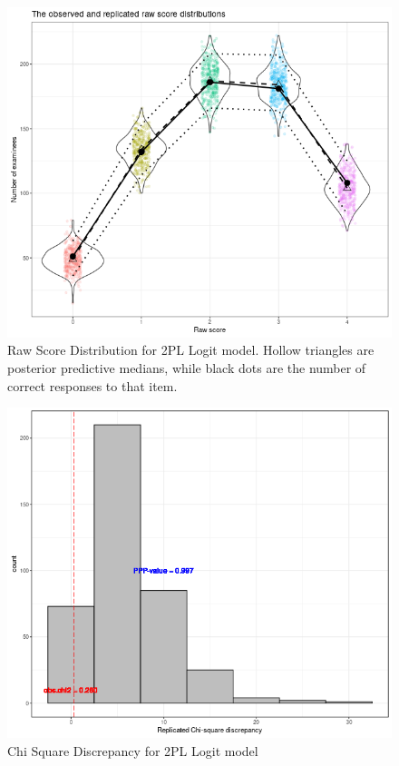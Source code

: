 \documentclass[12pt]{article}
\begin{document}
\begin{figure}[h]
\vspace{-0.5cm}
  \centering
  \includegraphics[width=1\columnwidth]{Plots/Plots_2PL_Logit/raw_score_dist.png}
  \caption{Raw Score Distribution for 2PL Logit model. Hollow triangles are posterior predictive medians, while black dots are the number of correct responses to that item.}
  \label{2pl_logit_raw_score}
\end{figure}

\begin{figure}[h]
\vspace{-0.5cm}
  \centering
  \includegraphics[width=1\columnwidth]{Plots/Plots_2PL_Logit/chi_sqaure.png}
  \caption{Chi Square Discrepancy for 2PL Logit model}
  \label{2pl_logit_chi_squar}
\end{figure}
\end{document}
